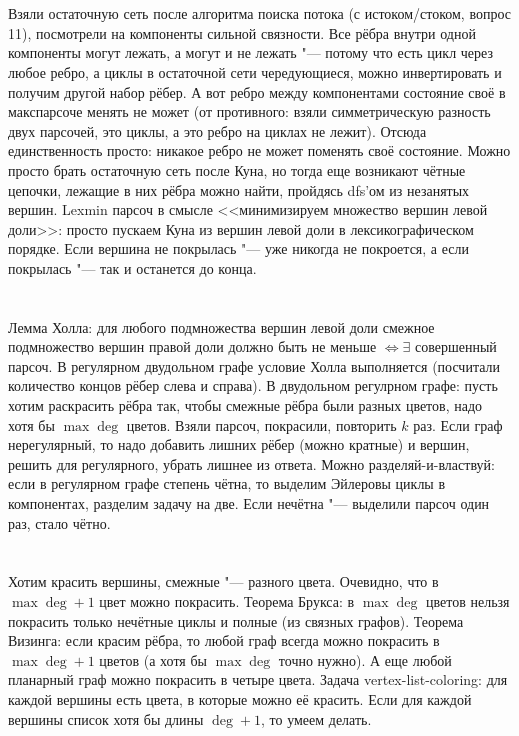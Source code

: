 \section{} %
Взяли остаточную сеть после алгоритма поиска потока (с истоком/стоком, вопрос 11), посмотрели на компоненты сильной связности.
Все рёбра внутри одной компоненты могут лежать, а могут и не лежать "--- потому что есть цикл через любое ребро, а циклы в остаточной сети
чередующиеся, можно инвертировать и получим другой набор рёбер.
А вот ребро между компонентами состояние своё в макспарсоче менять не может (от противного: взяли симметрическую разность двух парсочей, это циклы, а это ребро на циклах не лежит).
Отсюда единственность просто: никакое ребро не может поменять своё состояние.
Можно просто брать остаточную сеть после Куна, но тогда еще возникают чётные цепочки, лежащие в них рёбра можно найти, пройдясь dfs'ом из незанятых вершин.
Lexmin парсоч в смысле <<минимизируем множество вершин левой доли>>: просто пускаем Куна из вершин левой доли в лексикографическом порядке.
Если вершина не покрылась "--- уже никогда не покроется, а если покрылась "--- так и останется до конца.

\section{} %
Лемма Холла: для любого подмножества вершин левой доли смежное подмножество вершин правой доли должно быть не меньше $\iff \exists$ совершенный парсоч.
В регулярном двудольном графе условие Холла выполняется (посчитали количество концов рёбер слева и справа).
В двудольном регулрном графе: пусть хотим раскрасить рёбра так, чтобы смежные рёбра были разных цветов, надо хотя бы $\max \deg$ цветов.
Взяли парсоч, покрасили, повторить $k$ раз.
Если граф нерегулярный, то надо добавить лишних рёбер (можно кратные) и вершин, решить для регулярного, убрать лишнее из ответа.
Можно разделяй-и-властвуй: если в регулярном графе степень чётна, то выделим Эйлеровы циклы в компонентах, разделим задачу на две.
Если нечётна "--- выделили парсоч один раз, стало чётно.

\section{} %
Хотим красить вершины, смежные "--- разного цвета.
Очевидно, что в $\max \deg +1$ цвет можно покрасить.
Теорема Брукса: в $\max \deg$ цветов нельзя покрасить только нечётные циклы и полные (из связных графов).
Теорема Визинга: если красим рёбра, то любой граф всегда можно покрасить в $\max \deg + 1$ цветов (а хотя бы $\max \deg$ точно нужно).
А еще любой планарный граф можно покрасить в четыре цвета.
Задача vertex-list-coloring: для каждой вершины есть цвета, в которые можно её красить.
Если для каждой вершины список хотя бы длины $\deg + 1$, то умеем делать.

